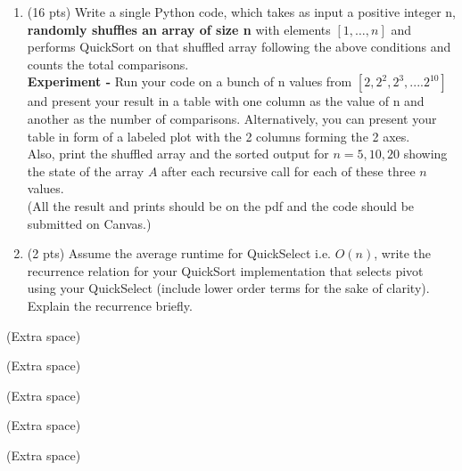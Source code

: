 \documentclass[12pt]{article}
\theoremstyle{remark}
\begin{document}
\begin{enumerate}
\begin{enumerate}
\item (16 pts) Write a single Python code, which takes as input a positive integer n, \textbf{randomly shuffles an array of size n} with elements $[1, \ldots, n]$ and performs QuickSort on that shuffled array following the above conditions and counts the total comparisons.
\\\textbf{Experiment -} Run your code on a bunch of n values from $[2, 2^2, 2^3, .... 2^{10}]$ and present your result in a table with one column as the value of n and another as the number of comparisons. Alternatively, you can present your table in form of a labeled plot with the 2 columns forming the 2 axes.\\ Also, print the shuffled array and the sorted output for $n = 5, 10, 20$ showing the state of the array $A$ after each recursive call for each of these three $n$ values. \\
(All the result and prints should be on the pdf and the code should be submitted on Canvas.)
\item (2 pts) Assume the average runtime for QuickSelect i.e. $O(n)$, write the recurrence relation for your QuickSort implementation that selects pivot using your QuickSelect (include lower order terms for the sake of clarity). Explain the recurrence briefly. \\
\end{enumerate}


\end{enumerate}
\pagebreak
(Extra space)

\pagebreak
(Extra space)

\pagebreak
(Extra space)

\pagebreak
(Extra space)

\pagebreak
(Extra space)
\end{document}
